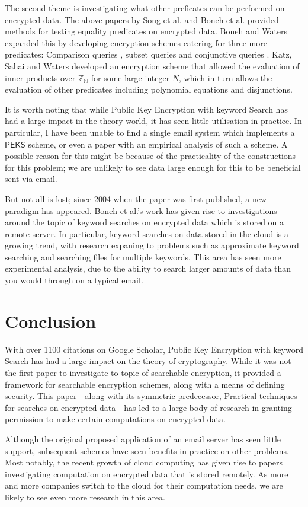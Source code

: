 \documentclass[a4paper,11pt]{article}
\begin{document}
    The second theme is investigating what other preficates can be performed on encrypted data. The above papers by Song et al. and Boneh et al. provided methods for testing equality predicates on encrypted data. Boneh and Waters\cite{boneh:predicate} expanded this by developing encryption schemes catering for three more predicates: Comparison queries , subset queries and conjunctive queries . Katz, Sahai and Waters\cite{katz:predicate} developed an encryption scheme that allowed the evaluation of inner products over $\mathbb{Z_N}$ for some large integer $N$, which in turn allows the evaluation of other predicates including polynomial equations and disjunctions.

    It is worth noting that while Public Key Encryption with keyword Search has had a large impact in the theory world, it has seen little utilisation in practice. In particular, I have been unable to find a single email system which implements a $\mathsf{PEKS}$ scheme, or even a paper with an empirical analysis of such a scheme. A possible reason for this might be because of the practicality of the constructions for this problem; we are unlikely to see data large enough for this to be beneficial sent via email.

    But not all is lost; since 2004 when the paper was first published, a new paradigm has appeared. Boneh et al.'s work has given rise to investigations around the topic of keyword searches on encrypted data which is stored on a remote server\cite{chang:remote}. In particular, keyword searches on data stored in the cloud is a growing trend, with research expaning to problems such as approximate keyword searching\cite{5462196} and searching files for multiple keywords\cite{6674958}. This area has seen more experimental analysis, due to the ability to search larger amounts of data than you would through on a typical email.

    \section{Conclusion}

    With over 1100 citations on Google Scholar, Public Key Encryption with keyword Search has had a large impact on the theory of cryptography. While it was not the first paper to investigate to topic of searchable encryption, it provided a framework for searchable encryption schemes, along with a means of defining security. This paper - along with its symmetric predecessor, Practical techniques for searches on encrypted data - has led to a large body of research in granting permission to make certain computations on encrypted data.

    Although the original proposed application of an email server has seen little support, subsequent schemes have seen benefits in practice on other problems. Most notably, the recent growth of cloud computing has given rise to papers investigating computation on encrypted data that is stored remotely. As more and more companies switch to the cloud for their computation needs, we are likely to see even more research in this area.

    \printbibliography
\end{document}
